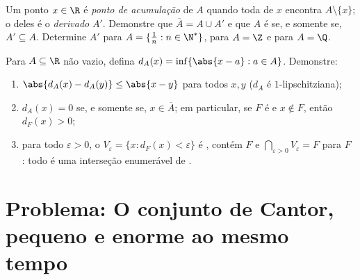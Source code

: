 \begin{exercise}[$\star\star$]\label{exo:b1:topology:11}
Um ponto $x \in \R$ é \emph{ponto de acumulação} de $A$ quando
toda  de $x$ encontra $A \setminus \{x\}$; o  deles é
o \emph{ derivado} $A'$. Demonstre que $\overline A = A \cup A'$
e que $A$ é  se, e somente se, $A' \subseteq A$. Determine
$A'$ para $A = \{\frac 1n : n \in \N^*\}$, para $A = \Z$ e para
$A = \Q$.
\end{exercise}

\begin{exercise}[$\star\star\star$]\label{exo:b1:topology:12}
Para $A \subseteq \R$ não vazio, defina $d_A(x) = \inf\{\abs{x - a}
: a \in A\}$. Demonstre:
\begin{enumerate}
  \item $\abs{d_A(x) - d_A(y)} \leq \abs{x - y}$ para todos $x, y$
        ($d_A$ é $1$-lipschitziana);
  \item $d_A(x) = 0$ se, e somente se, $x \in \overline A$; em
        particular, se $F$ é  e $x \notin F$, então
        $d_F(x) > 0$;
  \item para todo $\varepsilon > 0$, o  $V_\varepsilon =
        \{x : d_F(x) < \varepsilon\}$ é , contém $F$ e
        $\bigcap_{\varepsilon > 0} V_\varepsilon = F$ para $F$
        : todo  é uma interseção enumerável de
        .
\end{enumerate}
\end{exercise}

\section{Problema: O conjunto de Cantor, pequeno e enorme ao mesmo tempo}

